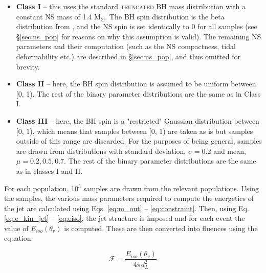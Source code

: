     \begin{itemize}

        \item \textbf{Class I} -- this uses the standard \textsc{truncated} BH mass
            distribution with a constant NS mass of 1.4 M$_\odot$. The BH spin
            distribution is the beta distribution from \cite{abbott_2020B}, and the NS
            spin is set identically to 0 for all samples (see \S\ref{sec:ns_pop}
            for reasons on why this assumption is valid). The remaining NS parameters
            and their computation (such as the NS compactness, tidal deformability etc.)
            are described in \S\ref{sec:ns_pop}, and thus omitted for brevity.

        \item \textbf{Class II} -- here, the BH spin distribution is assumed to be
            uniform between [0, 1). The rest of the binary parameter distributions are
            the same as in Class I.

        \item \textbf{Class III} -- here, the BH spin is a "restricted" Gaussian
            distribution between [0, 1), which means that samples between [0, 1) are
            taken as is but samples outside of this range are discarded.  For the
            purposes of being general, samples are drawn from distributions with standard
            deviation, $\sigma = 0.2$ and mean, $\mu = 0.2, 0.5, 0.7$.  The rest of the
            binary parameter distributions are the same as in classes I and II.

    \end{itemize}

    For each population, 10$^5$ samples are drawn from the relevant populations. Using
    the samples, the various mass parameters required to compute the energetics of the
    jet are calculated using Eqs. \ref{eq:m_out} -- \ref{eq:constraint}. Then, using Eq.
    \ref{eq:e_kin_jet} -- \ref{eq:eiso}, the jet structure is imposed and for each event
    the value of $E_{iso}(\theta_v)$ is computed. These are then converted into fluences
    using the equation:

    \begin{equation}
        \mathcal{F} = \dfrac{E_{iso}(\theta_v)}{4\pi d_L^2}
        \label{eq:fluence}
    \end{equation}


